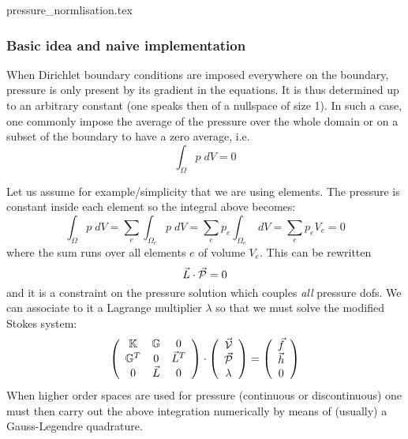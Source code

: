 \begin{flushright} {\tiny {\color{gray} pressure\_normlisation.tex}} \end{flushright}


\subsubsection{Basic idea and naive implementation}

When Dirichlet boundary conditions are imposed everywhere on the boundary, 
pressure is only present by its gradient in 
the equations. It is thus determined up to an arbitrary constant (one speaks then 
of a nullspace of size 1).  
In such a case, one commonly impose the average of the pressure over the whole domain or on 
a subset of the boundary 
to have a zero average, i.e.
\begin{equation}
\int_\Omega p\; dV = 0
\end{equation}

Let us assume for example/simplicity that we are using \QonePzero elements. The pressure is constant 
inside each element so the integral above becomes:
\begin{equation}
\int_\Omega p\; dV = 
\sum_e  \int_{\Omega_e} p\; dV = 
\sum_e  p_e \int_{\Omega_e}\; dV = 
\sum_e  p_e V_e = 0
\end{equation}
where the sum runs over all elements $e$ of volume $V_e$.
This can be rewritten 
\[
\vec{L} \cdot \vec{\cal P}=0
\] 
and it is a constraint on the pressure solution which couples {\it all} pressure dofs. 
We can associate to it a Lagrange multiplier $\lambda$ so that we must solve the modified Stokes system:
\[
\left(
\begin{array}{ccc}
{\mathbb{K}} & {\mathbb{G}} & 0\\ 
{\mathbb{G}}^T & 0 & \vec{L}^T \\
0 & \vec{L} & 0
\end{array}
\right)
\cdot
\left(
\begin{array}{c}
\vec{\cal V} \\ \vec{\cal P} \\ \lambda
\end{array}
\right)
=
\left(
\begin{array}{c}
\vec{f} \\ \vec{h} \\ 0
\end{array}
\right)
\]
When higher order spaces are used for pressure (continuous or discontinuous)
one must then carry out the above integration numerically by means of (usually)
a Gauss-Legendre quadrature.

